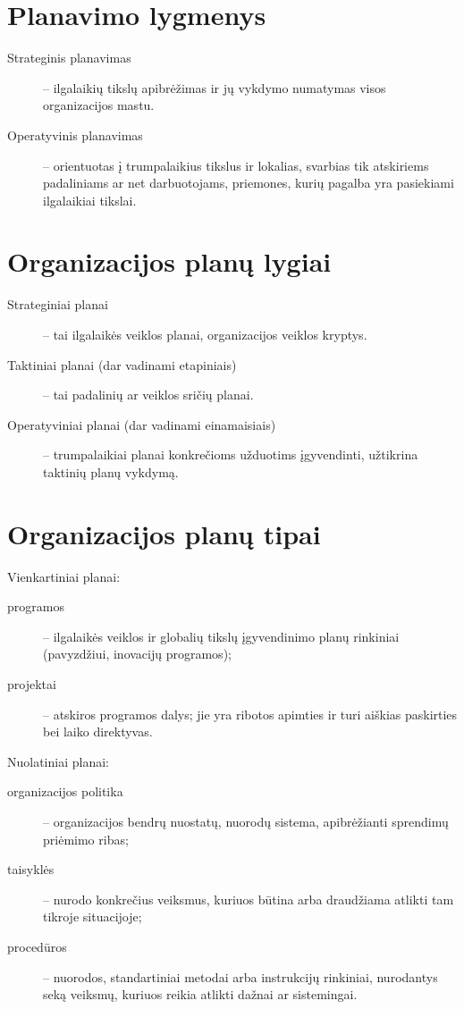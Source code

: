 \section{Planavimo lygmenys}

\begin{description}
  \item[Strateginis planavimas] – ilgalaikių tikslų apibrėžimas ir jų
    vykdymo numatymas visos organizacijos mastu.
  \item[Operatyvinis planavimas] – orientuotas į trumpalaikius tikslus
    ir lokalias, svarbias tik atskiriems padaliniams ar net darbuotojams,
    priemones, kurių pagalba yra pasiekiami ilgalaikiai tikslai.
\end{description}

\section{Organizacijos planų lygiai}

\begin{description}
  \item[Strateginiai planai] – tai ilgalaikės veiklos planai, organizacijos
    veiklos kryptys.
  \item[Taktiniai planai (dar vadinami etapiniais)] – tai padalinių
    ar veiklos sričių planai.
  \item[Operatyviniai planai (dar vadinami einamaisiais)] – trumpalaikiai
    planai konkrečioms užduotims įgyvendinti, užtikrina taktinių planų
    vykdymą.
\end{description}

\section{Organizacijos planų tipai}

Vienkartiniai planai:
\begin{description}
  \item[programos] – ilgalaikės veiklos ir globalių tikslų įgyvendinimo
    planų rinkiniai (pavyzdžiui, inovacijų programos);
  \item[projektai] – atskiros programos dalys; jie yra ribotos apimties
    ir turi aiškias paskirties bei laiko direktyvas.
\end{description}

Nuolatiniai planai:
\begin{description}
  \item[organizacijos politika] – organizacijos bendrų nuostatų, nuorodų
    sistema, apibrėžianti sprendimų priėmimo ribas;
  \item[taisyklės] – nurodo konkrečius veiksmus, kuriuos būtina arba
    draudžiama atlikti tam tikroje situacijoje;
  \item[procedūros] – nuorodos, standartiniai metodai arba instrukcijų
    rinkiniai, nurodantys seką veiksmų, kuriuos reikia atlikti dažnai
    ar sistemingai.
\end{description}

